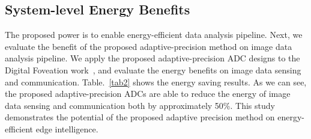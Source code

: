 \subsection{System-level Energy Benefits}\label{system}

The proposed power is to enable energy-efficient data analysis pipeline. Next, we evaluate the benefit of
the proposed adaptive-precision method on image data analysis pipeline. We apply the proposed adaptive-precision 
ADC designs to the Digital Foveation work~\cite{lubana_digital_2018}, and evaluate the energy benefits on image 
data sensing and communication. Table.~\ref{tab2} shows the energy saving results. As we can see, the proposed 
adaptive-precision ADCs are able to reduce the energy of image data sensing and communication both by approximately 
50\%. This study demonstrates the potential of the proposed adaptive precision method on energy-efficient edge
intelligence. 

